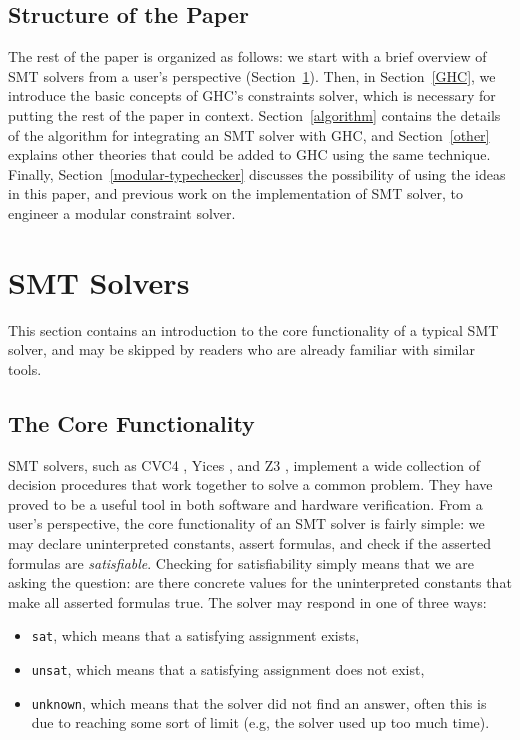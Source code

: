 \documentclass{sigplanconf}
\begin{document}
\subsection{Structure of the Paper}

The rest of the paper is organized as follows:
we start with a brief overview of SMT solvers from a user's perspective
(Section~\ref{smt}).  Then, in Section~\ref{GHC}, we introduce the
basic concepts of GHC's constraints
solver, which is necessary for putting the rest of the paper in context.
Section~\ref{algorithm} contains the details of the algorithm for
integrating an SMT solver with GHC, and Section~\ref{other} explains
other theories that could be added to GHC using the same technique.
Finally, Section~\ref{modular-typechecker} discusses the possibility
of using the ideas in this paper, and previous work on the
implementation of SMT solver, to engineer a modular constraint solver.


\section {SMT Solvers}
\label{smt}

This section contains an introduction to the core functionality
of a typical SMT solver, and may be skipped by readers who are already
familiar with similar tools.

\subsection{The Core Functionality}

SMT solvers, such as CVC4 \cite{cvc4}, Yices \cite{yices}, and Z3
\cite{z3}, implement a wide collection of decision procedures that
work together to solve a common problem.  They have proved to be a useful
tool in both software and hardware verification.
From a user's perspective, the core functionality of an SMT solver is fairly
simple: we may declare uninterpreted constants, assert formulas,
and check if the asserted formulas are {\em satisfiable}.  Checking
for satisfiability simply means that we are asking the
question: are there concrete values for the uninterpreted constants
that make all asserted formulas true. The solver may respond in
one of three ways:
\begin{itemize}
\item \Verb"sat", which means that a satisfying assignment exists,
\item \Verb"unsat", which means that a satisfying assignment does not exist,
\item \Verb"unknown", which means that the solver did not find an answer,
      often this is due to reaching some sort of limit (e.g, the solver
      used up too much time).
\end{itemize}
\end{document}
